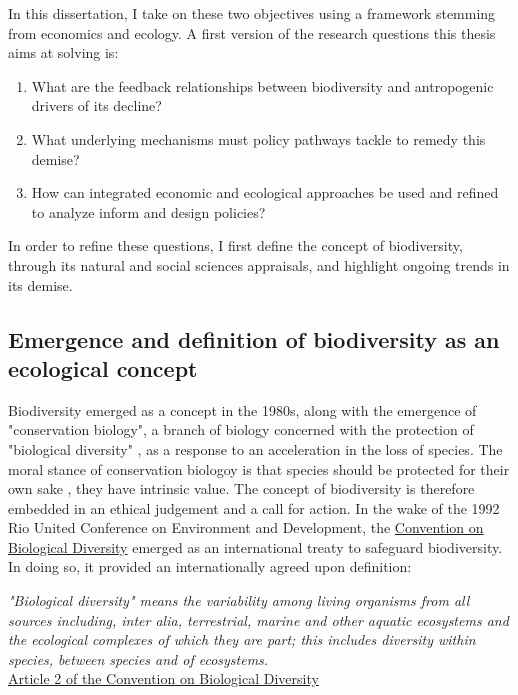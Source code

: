 In this dissertation, I take on these two objectives using a framework stemming from economics and ecology. A first version of the research questions this thesis aims at solving is: 
\begin{enumerate}
\setlength{\itemsep}{0pt} %
\item What are the feedback relationships between biodiversity and antropogenic drivers of its decline? 
\item What underlying mechanisms must policy pathways tackle to remedy this demise?
\item  How can integrated economic and ecological approaches be used and refined to analyze inform and design policies? 
\end{enumerate}

In order to refine these questions, I first define the concept of biodiversity, through its natural and social sciences appraisals, and highlight ongoing trends in its demise.

\clearpage


{}
\subsection*{Emergence and definition of biodiversity as an ecological concept}


Biodiversity emerged as a concept in the 1980s, along with the emergence of "conservation biology", a branch of biology concerned with the protection of "biological diversity" \citep{soule_what_1985}, as a response to an acceleration in the loss of species. The moral stance of conservation biologoy is that species should be protected for their own sake \citep{soule_conservation_1986}, they have intrinsic value. 
The concept of biodiversity is therefore embedded in an ethical judgement and a call for action. In the wake of the 1992 Rio United Conference on Environment and Development, the \href{https://www.cbd.int/}{Convention on Biological Diversity} emerged as an international treaty to safeguard biodiversity. In doing so, it provided an internationally agreed upon definition:

\begin{displayquote}
\textit{"Biological diversity" means the variability among living organisms from all sources including, inter alia, terrestrial, marine and other aquatic ecosystems and the ecological complexes of which they are part; this includes diversity within species, between species and of ecosystems.}\\
\hspace*{\fill} \small{\href{https://www.cbd.int/convention/articles/default.shtml?a=cbd-02}{Article 2 of the Convention on Biological Diversity}}
\end{displayquote}

